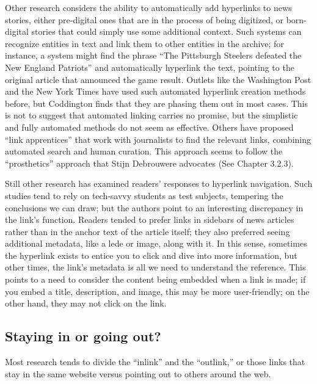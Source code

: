 Other research considers the ability to automatically add hyperlinks to news stories, either pre-digital ones that are in the process of being digitized, or born-digital stories that could simply use some additional context.\autocite{automatically_embedding_newsworthy} Such systems can recognize entities in text and link them to other entities in the archive; for instance, a system might find the phrase ``The Pittsburgh Steelers defeated the New England Patriots'' and automatically hyperlink the text, pointing to the original article that announced the game result. Outlets like the Washington Post and the New York Times have used such automated hyperlink creation methods before, but Coddington finds that they are phasing them out in most cases.\autocite{coddington_building_2012} This is not to suggest that automated linking carries no promise, but the simplistic and fully automated methods do not seem as effective. Others have proposed ``link apprentices'' that work with journalists to find the relevant links, combining automated search and human curation.\autocite{link apprentice} This approach seems to follow the ``prosthetics'' approach that Stijn Debrouwere advocates (See Chapter 3.2.3).

Still other research has examined readers' responses to hyperlink navigation. Such studies tend to rely on tech-savvy students as test subjects, tempering the conclusions we can draw; but the authors point to an interesting discrepancy in the link's function. Readers tended to prefer links in sidebars of news articles rather than in the anchor text of the article itself; they also preferred seeing additional metadata, like a lede or image, along with it. In this sense, sometimes the hyperlink exists to entice you to click and dive into more information, but other times, the link's metadata is all we need to understand the reference. This points to a need to consider the content being embedded when a link is made; if you embed a title, description, and image, this may be more user-friendly; on the other hand, they may not click on the link.

\subsection{Staying in or going out?}

Most research tends to divide the ``inlink'' and the ``outlink,'' or those links that stay in the same website versus pointing out to others around the web.

